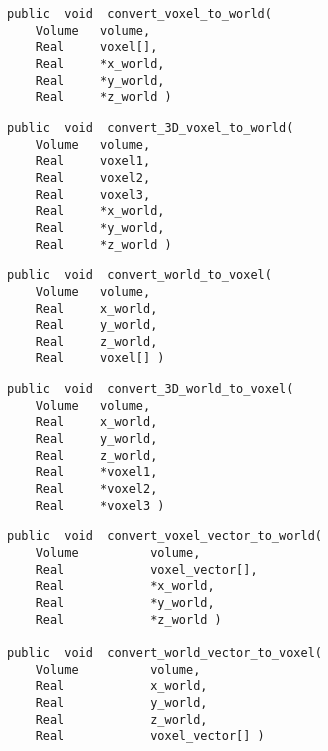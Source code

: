 {\bf\begin{verbatim}
public  void  convert_voxel_to_world(
    Volume   volume,
    Real     voxel[],
    Real     *x_world,
    Real     *y_world,
    Real     *z_world )
\end{verbatim}}


{\bf\begin{verbatim}
public  void  convert_3D_voxel_to_world(
    Volume   volume,
    Real     voxel1,
    Real     voxel2,
    Real     voxel3,
    Real     *x_world,
    Real     *y_world,
    Real     *z_world )
\end{verbatim}}


{\bf\begin{verbatim}
public  void  convert_world_to_voxel(
    Volume   volume,
    Real     x_world,
    Real     y_world,
    Real     z_world,
    Real     voxel[] )
\end{verbatim}}


{\bf\begin{verbatim}
public  void  convert_3D_world_to_voxel(
    Volume   volume,
    Real     x_world,
    Real     y_world,
    Real     z_world,
    Real     *voxel1,
    Real     *voxel2,
    Real     *voxel3 )
\end{verbatim}}


{\bf\begin{verbatim}
public  void  convert_voxel_vector_to_world(
    Volume          volume,
    Real            voxel_vector[],
    Real            *x_world,
    Real            *y_world,
    Real            *z_world )

public  void  convert_world_vector_to_voxel(
    Volume          volume,
    Real            x_world,
    Real            y_world,
    Real            z_world,
    Real            voxel_vector[] )
\end{verbatim}}

